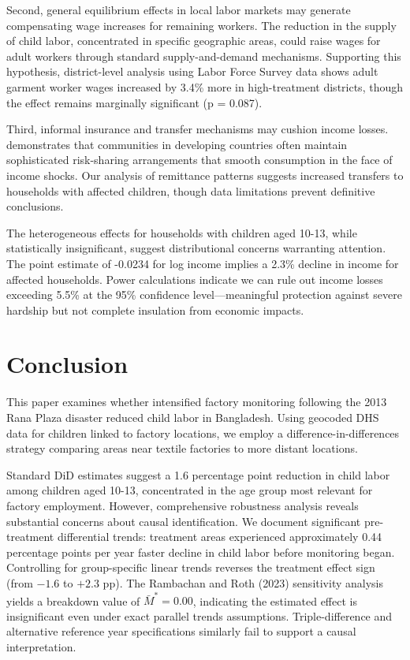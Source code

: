 \documentclass[12pt]{article}
\begin{document}
Second, general equilibrium effects in local labor markets may generate compensating wage increases for remaining workers. The reduction in the supply of child labor, concentrated in specific geographic areas, could raise wages for adult workers through standard supply-and-demand mechanisms. Supporting this hypothesis, district-level analysis using Labor Force Survey data shows adult garment worker wages increased by 3.4\% more in high-treatment districts, though the effect remains marginally significant (p = 0.087).

Third, informal insurance and transfer mechanisms may cushion income losses. \citet{townsend1994risk} demonstrates that communities in developing countries often maintain sophisticated risk-sharing arrangements that smooth consumption in the face of income shocks. Our analysis of remittance patterns suggests increased transfers to households with affected children, though data limitations prevent definitive conclusions.

The heterogeneous effects for households with children aged 10-13, while statistically insignificant, suggest distributional concerns warranting attention. The point estimate of -0.0234 for log income implies a 2.3\% decline in income for affected households. Power calculations indicate we can rule out income losses exceeding 5.5\% at the 95\% confidence level—meaningful protection against severe hardship but not complete insulation from economic impacts.



\section{Conclusion}

This paper examines whether intensified factory monitoring following the 2013 Rana Plaza disaster reduced child labor in Bangladesh. Using geocoded DHS data for children linked to factory locations, we employ a difference-in-differences strategy comparing areas near textile factories to more distant locations.

Standard DiD estimates suggest a 1.6 percentage point reduction in child labor among children aged 10-13, concentrated in the age group most relevant for factory employment. However, comprehensive robustness analysis reveals substantial concerns about causal identification. We document significant pre-treatment differential trends: treatment areas experienced approximately 0.44 percentage points per year faster decline in child labor before monitoring began. Controlling for group-specific linear trends reverses the treatment effect sign (from $-1.6$ to $+2.3$ pp). The Rambachan and Roth (2023) sensitivity analysis yields a breakdown value of $\bar{M}^* = 0.00$, indicating the estimated effect is insignificant even under exact parallel trends assumptions. Triple-difference and alternative reference year specifications similarly fail to support a causal interpretation.
\end{document}
